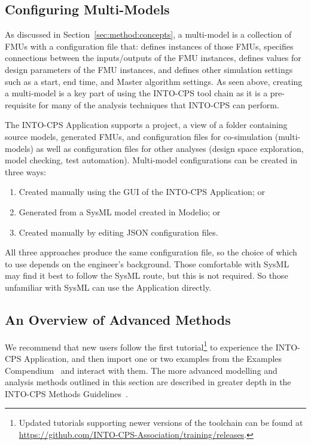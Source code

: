 \subsection{Configuring Multi-Models}

As discussed in Section~\ref{sec:method:concepts}, a multi-model  is a collection of FMUs with a configuration file that: defines instances of those FMUs, specifies connections between the inputs/outputs of the FMU instances, defines values for design parameters of the FMU instances, and defines other simulation settings such as a start, end time, and Master algorithm settings. As seen above, creating a multi-model is a key part of using the INTO-CPS tool chain as it is a pre-requisite for many of the analysis techniques that INTO-CPS can perform.

The INTO-CPS Application supports a project, a view of a folder containing source models, generated FMUs, and configuration files for co-simulation (multi-models) as well as configuration files for other analyses (design space exploration, model checking, test automation). Multi-model configurations can be created in three ways:

\begin{enumerate}[noitemsep]
  \item Created manually using the GUI of the INTO-CPS Application; or
  \item Generated from a SysML model created in Modelio; or
  \item Created manually by editing JSON configuration files.
\end{enumerate}

All three approaches produce the same configuration file, so the choice of which to use depends on the engineer's background. Those comfortable with SysML may find it best to follow the SysML route, but this is not required. So those unfamiliar with SysML can use the Application directly.


\subsection{An Overview of Advanced Methods}
\label{cha:method:advanced}
\label{sec:method:advanced}

We recommend that new users follow the first tutorial\footnote{Updated tutorials supporting newer versions of the toolchain can be found at \url{https://github.com/INTO-CPS-Association/training/releases}.} to experience the INTO-CPS Application, and then import one or two examples from the Examples Compendium~\cite{Fitzgerald&18} and interact with them. The more advanced modelling and analysis methods outlined in this section are described in greater depth in the INTO-CPS Methods Guidelines~\cite{Pierce&18}. 

